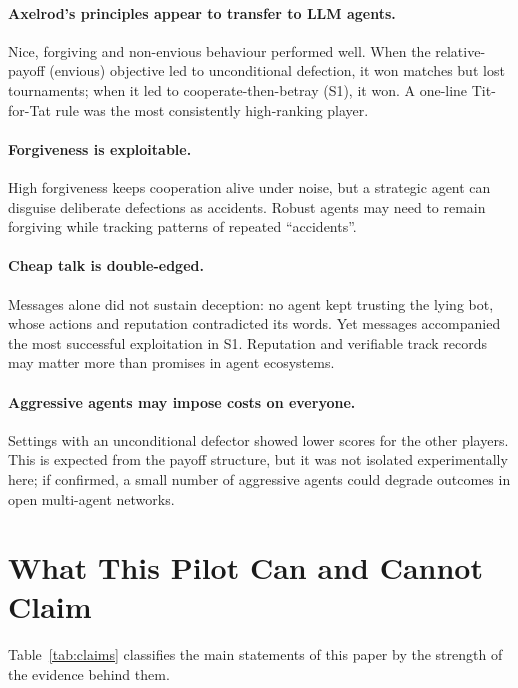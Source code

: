\documentclass[11pt,a4paper]{article}
\begin{document}
\paragraph{Axelrod's principles appear to transfer to LLM agents.} Nice, forgiving and non-envious behaviour performed well. When the relative-payoff (envious) objective led to unconditional defection, it won matches but lost tournaments; when it led to cooperate-then-betray (S1), it won. A one-line Tit-for-Tat rule was the most consistently high-ranking player.

\paragraph{Forgiveness is exploitable.} High forgiveness keeps cooperation alive under noise, but a strategic agent can disguise deliberate defections as accidents. Robust agents may need to remain forgiving while tracking patterns of repeated ``accidents''.

\paragraph{Cheap talk is double-edged.} Messages alone did not sustain deception: no agent kept trusting the lying bot, whose actions and reputation contradicted its words. Yet messages accompanied the most successful exploitation in S1. Reputation and verifiable track records may matter more than promises in agent ecosystems.

\paragraph{Aggressive agents may impose costs on everyone.} Settings with an unconditional defector showed lower scores for the other players. This is expected from the payoff structure, but it was not isolated experimentally here; if confirmed, a small number of aggressive agents could degrade outcomes in open multi-agent networks.

\section{What This Pilot Can and Cannot Claim}
\label{sec:claims}

Table~\ref{tab:claims} classifies the main statements of this paper by the strength of the evidence behind them.
\end{document}
